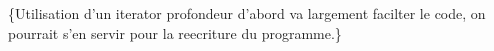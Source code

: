 
\begin{DoxyRefList}
\item[\label{todo__todo000002}%
\hypertarget{todo__todo000002}{}%
Class \hyperlink{class_tree_item}{Tree\-Item} ]\{Utilisation d'un iterator profondeur d'abord va largement facilter le code, on pourrait s'en servir pour la reecriture du programme.\} 
\end{DoxyRefList}